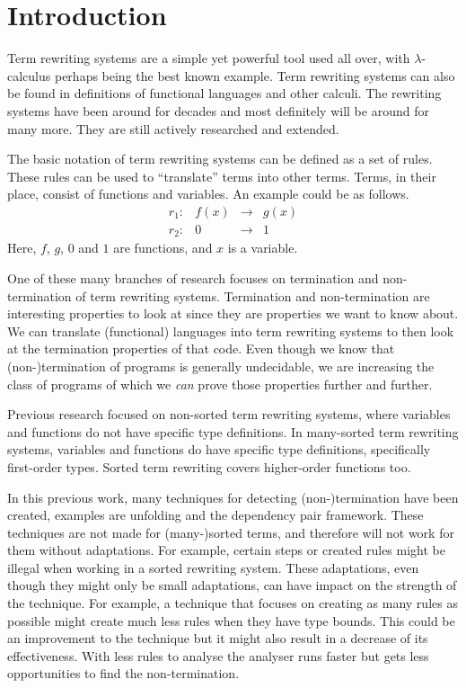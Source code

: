 \chapter{Introduction}\label{introduction}
Term rewriting systems are a simple yet powerful tool used all over, with $\lambda$-calculus perhaps being the best known example. Term rewriting systems can also be found in definitions of functional languages and other calculi. The rewriting systems have been around for decades and most definitely will be around for many more. They are still actively researched and extended. 

The basic notation of term rewriting systems can be defined as a set of rules. These rules can be used to ``translate'' terms into other terms. Terms, in their place, consist of functions and variables. An example could be as follows.
\[
\begin{array}{lrcl}
r_1: & f(x) & \rightarrow & g(x) \\
r_2: & 0 & \rightarrow & 1
\end{array}
\]
Here, $f$, $g$, $0$ and $1$ are functions, and $x$ is a variable. 

One of these many branches of research focuses on termination and non-termination of term rewriting systems. Termination and non-termination are interesting properties to look at since they are properties we want to know about. We can translate (functional) languages into term rewriting systems to then look at the termination properties of that code. Even though we know that (non-)termination of programs is generally undecidable, we are increasing the class of programs of which we \textit{can} prove those properties further and further.

Previous research focused on non-sorted term rewriting systems, where variables and functions do not have specific type definitions. In many-sorted term rewriting systems, variables and functions do have specific type definitions, specifically first-order types. Sorted term rewriting covers higher-order functions too. 

In this previous work, many techniques for detecting (non-)termination have been created, examples are unfolding and the dependency pair framework. These techniques are not made for (many-)sorted terms, and therefore will not work for them without adaptations. For example, certain steps or created rules might be illegal when working in a sorted rewriting system. These adaptations, even though they might only be small adaptations, can have impact on the strength of the technique. For example, a technique that focuses on creating as many rules as possible might create much less rules when they have type bounds. This could be an improvement to the technique but it might also result in a decrease of its effectiveness. With less rules to analyse the analyser runs faster but gets less opportunities to find the non-termination.  

